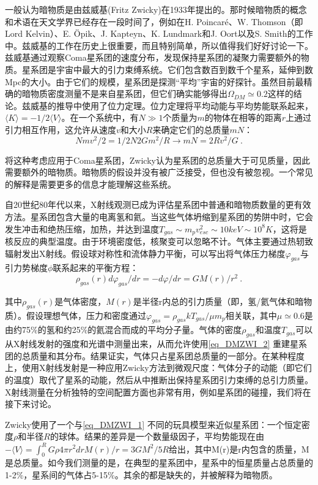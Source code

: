 

一般认为暗物质是由兹威基(Fritz Zwicky)在1933年提出的。那时候暗物质的概念和术语在天文学界已经存在一段时间了，例如在H. Poincaré、W. Thomson（即Lord Kelvin）、E. Öpik、J. Kapteyn、K. Lundmark和J. Oort以及S. Smith的工作中。兹威基的工作在历史上很重要，而且特别简单，所以值得我们好好讨论一下。兹威基通过观察Coma星系团的速度分布，发现保持星系团的凝聚力需要额外的物质。星系团是宇宙中最大的引力束缚系统。它们包含数百到数千个星系，延伸到数Mpc的大小。由于它们的规模，星系团是探测“平均”宇宙的好探针。虽然目前最精确的暗物质密度测量不是来自星系团，但它们确实能够得出$\Omega_{DM} \simeq 0.2$这样的结论。兹威基的推导中使用了位力定理。位力定理将平均动能与平均势能联系起来，$\langle K \rangle  = -1/2 \langle V \rangle $。在一个系统中，有$N \gg 1$个质量为$m$的物体在相等的距离$r$上通过引力相互作用，这允许从速度$v$和大小$R$来确定它们的总质量$mN$：
\begin{equation}\label{eq_DMZWI_1}
N mv^2 / 2 = 1/2 N2 G m^2 / R \rightarrow mN = 2R v^2 / G  ~.
\end{equation}


将这种考虑应用于Coma星系团，Zwicky认为星系团的总质量大于可见质量，因此需要额外的暗物质。暗物质的假设并没有被广泛接受，但也没有被忽视。一个常见的解释是需要更多的信息才能理解这些系统。

自20世纪80年代以来，X射线观测已成为评估星系团中普通和暗物质数量的更有效方法。星系团包含大量的电离氢和氦。当这些气体坍缩到星系团的势阱中时，它会发生冲击和绝热压缩，加热，并达到温度$T_{gas} \sim m_pv^2_{esc} \sim 10 keV \sim  10^8 K$，这将是核反应的典型温度。由于环境密度低，核聚变可以忽略不计。气体主要通过热轫致辐射发出X射线。假设球对称性和流体静力平衡，可以写出将气体压力梯度$\varphi_{gas}$与引力势梯度$\phi$联系起来的平衡方程：
\begin{equation}\label{eq_DMZWI_2}
\rho_{gas}(r) d\varphi_{gas}/dr = - d\varphi / dr = GM(r)/ r^2~. 
\end{equation}
 

其中$\rho_{gas}(r)$是气体密度，$M(r)$是半径r内总的引力质量（即，氢/氦气体和暗物质）。假设理想气体，压力和密度通过$\varphi_{gas} = \rho_{gas}kT_{gas}/\mu m_p$相关联，其中$\mu\simeq 0.6$是由约75\%的氢和约25\%的氦混合而成的平均分子量。气体的密度$\rho_{gas}$和温度$T_{gas}$可以从X射线发射的强度和光谱中测量出来，从而允许使用\autoref{eq_DMZWI_2} 重建星系团的总质量和其分布。结果证实，气体只占星系团总质量的一部分。在某种程度上，使用X射线发射是一种应用Zwicky方法到微观尺度：气体分子的动能（即它们的温度）取代了星系的动能，然后从中推断出保持星系团引力束缚的总引力质量。X射线测量在分析独特的空间配置方面也非常有用，例如星系团的碰撞，我们将在接下来讨论。

Zwicky使用了一个与\autoref{eq_DMZWI_1} 不同的玩具模型来近似星系团：一个恒定密度$\rho$和半径$R$的球体。结果的差异是一个数量级因子，平均势能现在由$-\langle V\rangle = \int^R_0 G \rho 4\pi r^2 dr M(r)/r = 3GM^2/5 R$给出，其中M(r)是r内包含的质量，M是总质量。如今我们测量的是，在典型的星系团中，星系中的恒星质量占总质量的1-2\%，星系间的气体占5-15\%。其余的都是缺失的，并被解释为暗物质。
